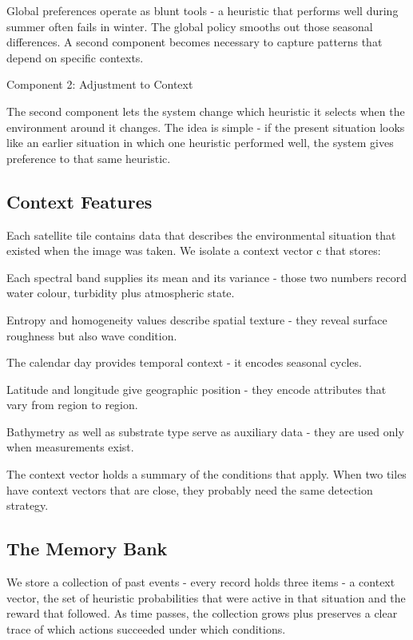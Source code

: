 \documentclass[11pt,a4paper]{article}
\begin{document}
Global preferences operate as blunt tools - a heuristic that performs well during summer often fails in winter. The global policy smooths out those seasonal differences. A second component becomes necessary to capture patterns that depend on specific contexts.


Component 2: Adjustment to Context
\label{sec:component2}

The second component lets the system change which heuristic it selects when the environment around it changes. The idea is simple - if the present situation looks like an earlier situation in which one heuristic performed well, the system gives preference to that same heuristic.

\subsection{Context Features}

Each satellite tile contains data that describes the environmental situation that existed when the image was taken. We isolate a context vector c that stores:

Each spectral band supplies its mean and its variance - those two numbers record water colour, turbidity plus atmospheric state.

Entropy and homogeneity values describe spatial texture - they reveal surface roughness but also wave condition.

The calendar day provides temporal context - it encodes seasonal cycles.

Latitude and longitude give geographic position - they encode attributes that vary from region to region.

Bathymetry as well as substrate type serve as auxiliary data - they are used only when measurements exist.

The context vector holds a summary of the conditions that apply. When two tiles have context vectors that are close, they probably need the same detection strategy.

\subsection{The Memory Bank}

We store a collection of past events - every record holds three items - a context vector, the set of heuristic probabilities that were active in that situation and the reward that followed. As time passes, the collection grows plus preserves a clear trace of which actions succeeded under which conditions.
\end{document}
